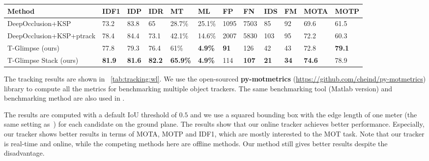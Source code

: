 \documentclass{article}
\begin{document}
\begin{table*}

	\begin{center}
		\caption{Multiple people tracking results on the WILDTRACK dataset.}
		\label{tab:tracking:wl}
			\scriptsize{
		\begin{tabular}{l|p{0.3cm}p{0.3cm}p{0.3cm}p{0.3cm}p{0.3cm}p{0.3cm}p{0.3cm}p{0.3cm}p{0.3cm}p{0.5cm}p{0.5cm}}
			\hline
			Method	&	IDF1	&	IDP	&	IDR	&	MT	&	ML	&	FP	&	FN	&	IDS	&	FM	&	MOTA	&	MOTP	\\ \hline
			DeepOcclusion+KSP	&	73.2	&	83.8	&	65	&	28.7\%	&	25.1\%	&	1095	&	7503	&	85	&	92	&	69.6	&	61.5	\\
			DeepOcclusion+KSP+ptrack	&	78.4	&	84.4	&	73.1	&	42.1\%	&	14.6\%	&	2007	&	5830	&	103	&	95	&	72.2	&	60.3	\\
			T-Glimpse (ours)	&	77.8	&	79.3	&	76.4	&	61\%	&	\textbf{4.9\%}	&	\textbf{91}	&	126	&	42	&	43	&	72.8	&	\textbf{79.1}	\\
			T-Glimpse Stack (ours)	&	\textbf{81.9}	&	\textbf{81.6}	&	\textbf{82.2}	&	\textbf{65.9\%}	&	\textbf{4.9\%}	&	114	&	\textbf{107}	&	\textbf{21}	&	\textbf{34}	&	\textbf{74.6}	&	78.9	\\
			\hline
		\end{tabular}
		}
	\end{center}
\end{table*}
The tracking results are shown in \tablename~\ref{tab:tracking:wl}. We use the open-sourced \textbf{py-motmetrics} (\url{https://github.com/cheind/py-motmetrics}) library to compute all the metrics
for benchmarking multiple object trackers. The same benchmarking tool (Matlab version) and benchmarking method are also used in \cite{chavdarova2018wildtrack}.

The results are computed with a default IoU threshold of $0.5$ and we use a squared bounding box with the edge length of one meter (the same setting as~\cite{chavdarova2018wildtrack}) for each candidate on the ground plane.
The results show that our online tracker achieves better performance. 
Especially, our tracker
shows better results in terms of MOTA, MOTP and IDF1, which are mostly interested to the MOT task.
Note that our tracker is real-time and online, while the competing methods here are offline
methods. Our method still gives better results despite the disadvantage.
\end{document}
